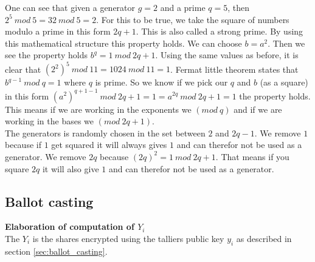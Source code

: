 \noindent
One can see that given a generator $g=2 $ and a prime $q=5$, then \begin{math}2^5 \ mod \ 5 = 32 \ mod \ 5 = 2\end{math}. For this to be true, we take the square of numbers modulo a prime in this form \begin{math}2q+1\end{math}. This is also called a strong prime. By using this mathematical structure this property holds. We can choose \begin{math}b=a^2\end{math}. Then we see the property holds \begin{math}b^{q} = 1 \ mod \ 2q+1\end{math}. Using the same values as before, it is clear that \begin{math}(2^2)^5 \ mod \ 11 = 1024 \ mod \ 11 = 1\end{math}. Fermat little theorem states that \begin{math}b^{q-1} \ mod \ q = 1\end{math} where \begin{math}q\end{math} is prime. So we know if we pick our \begin{math}q\end{math} and \begin{math}b\end{math} (as a square)  in this form \begin{math}(a^{2})^{q+1-1} \ mod \ 2q+1 =1 =  a^{2q} \ mod \ 2q+1 =1\end{math} the property holds. This means if we are working in the exponents we $(mod \ q)$ and if we are working in the bases we $(mod \ 2q+1)$.\\

\noindent
The generators is randomly chosen in the set between $2$ and $2q-1$.  We remove $1$ because if $1$ get squared it will always gives $1$ and can therefor not be used as a generator. We remove $2q$ because $(2q)^2 = 1 \ mod \ 2q+1$. That means if you square $2q$ it will also give $1$ and can therefor not be used as a generator.

\subsection{Ballot casting}

\textbf{Elaboration of computation of  $Y_i$}\\
The $Y_i$ is the shares encrypted using the talliers public key $y_i$ as described in section \ref{sec:ballot_casting}.
 
